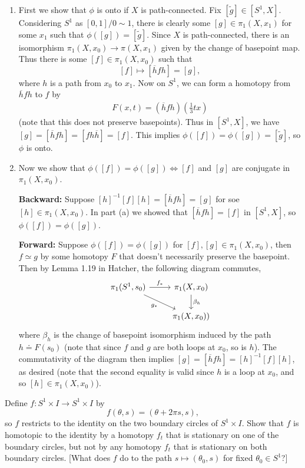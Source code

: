 \documentclass[twoside,10pt]{article}
\begin{document}
\begin{enumerate}
	\item First we show that $\phi$ is onto if $X$ is path-connected. Fix $[\tilde{g}] \in [S^{1},X]$. Considering $S^{1}$ as $[0,1] / 0 \sim 1$, there is clearly some $[g] \in \pi_1(X,x_1)$ for some $x_1$ such that $\phi([g]) = [\tilde{g}]$. Since $X$ is path-connected, there is an isomorphism $\pi_1(X,x_0)\to \pi(X,x_1)$ given by the change of basepoint map. Thus there is some $[f] \in \pi_1(X,x_0)$ such that
		\[
			[f] \mapsto [\overline{h}fh] = [g],
		\] where $h$ is a path from $x_0$ to $x_1$. Now on $S^{1}$, we can form a homotopy from $\overline{h}f h$ to $f$ by
		\begin{align*}
			F(x,t) = (\overline{h}fh)\left(\frac{1}{3} tx\right)
		\end{align*}
		(note that this does not preserve basepoints). Thus in $[S^{1},X]$, we have $[g]=[\overline{h}fh] = [fh\overline{h}] = [f]$. This implies $\phi([f]) = \phi([g]) = [\tilde{g}]$, so $\phi$ is onto.

	\item Now we show that $\phi([f])=\phi([g]) \iff [f]$ and $[g]$ are conjugate in $\pi_1(X,x_0)$.

			\textbf{Backward:} Suppose $[h]^{-1}[f][h] = [\overline{h}fh]=[g]$ for soe $[h] \in \pi_1(X,x_0)$. In part (a) we showed that $[\overline{h}fh]=[f]$ in $[S^1,X]$, so $\phi([f])=\phi([g])$.

			\textbf{Forward:} Suppose $\phi([f])=\phi([g])$ for $[f],[g] \in \pi_1(X,x_0)$, then $f \simeq g$ by some homotopy $F$ that doesn't necessarily preserve the basepoint. Then by Lemma 1.19 in Hatcher, the following diagram commutes,
			\[
			\begin{tikzcd}
				\pi_1(S^{1},s_0) \rar{f_{*}} \arrow[rd,"g_{*}"'] & \pi_1(X,x_0) \dar{\beta_{h}} \\
										 & \pi_1(X,x_0))
			\end{tikzcd}
		\] where $\beta_{h}$ is the change of basepoint isomorphism induced by the path $h \doteq F(s_0)$ (note that since $f$ and $g$ are both loops at $x_0$, so is $h$). The commutativity of the diagram then implies $[g] = [\overline{h} f h] = [h]^{-1}[f][h]$, as desired (note that the second equality is valid since $h$ is a loop at $x_0$, and so $[h] \in \pi_1(X,x_0)$).
\end{enumerate}

\newpage

\begin{exer}[1.1: 7]
Define $f:S^{1}\times I \to S^{1}\times I$ by
\[
	f(\theta,s) = (\theta+2\pi s, s),
\] so $f$ restricts to the identity on the two boundary circles of $S^{1}\times I$. Show that $f$ is homotopic to the identity by a homotopy $f_{t}$ that is stationary on one of the boundary circles, but not by any homotopy $f_{t}$ that is stationary on both boundary circles. [What does $f$ do to the path $s\mapsto (\theta_0,s)$ for fixed $\theta_0 \in S^{1}$?]
\end{exer}
\end{document}
